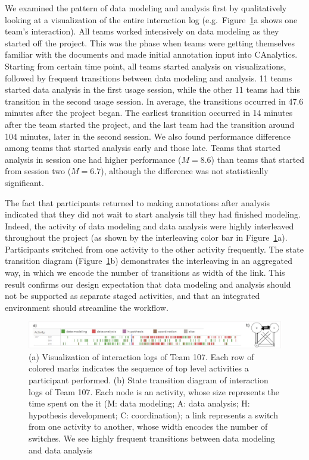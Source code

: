 We examined the pattern of data modeling and analysis first by
qualitatively looking at a visualization of the entire interaction log
(e.g.~Figure~\ref{fig:interleaving}a shows one team's interaction). All teams
worked intensively on data modeling as they started off the project.
This was the phase when teams were getting themselves familiar with the
documents and made initial annotation input into CAnalytics. Starting from certain
time point, all teams started analysis on visualizations,
followed by frequent transitions between data modeling and analysis. 11
teams started data analysis in the first usage session, while the other
11 teams had this transition in the second usage session. In average,
the transitions occurred in 47.6 minutes after the project began. The earliest transition occurred in 14 minutes after the team started the project, and the last team
had the transition around 104 minutes, later in the second session. We
also found performance difference among teams that started analysis
early and those late. Teams that started analysis in session one had
higher performance ($M=8.6$) than teams that started from session two
($M=6.7$), although the difference was not statistically significant.

The fact that participants returned to making annotations after analysis
indicated that they did not wait to start analysis till they had
finished modeling. Indeed, the activity of data modeling and data
analysis were highly interleaved throughout the project (as shown by the interleaving color bar in Figure~\ref{fig:interleaving}a). Participants switched from
one activity to the other activity frequently. The state transition
diagram (Figure~\ref{fig:interleaving}b) demonstrates the interleaving in an aggregated way, in which we
encode the number of transitions as width of the link. This result
confirms our design expectation that data modeling and analysis should
not be supported as separate staged activities, and that an integrated
environment should streamline the workflow.

\begin{figure}
\centering
\includegraphics[width=6.5in]{./img/intertwined.jpg}
\caption{(a) Visualization of interaction logs of Team 107. Each row of
colored marks indicates the sequence of top level activities a
participant performed. (b) State transition diagram of interaction logs of Team 107. Each node is an activity, whose size represents the time spent on the it (M: data modeling; A: data analysis; H: hypothesis development; C: coordination); a
link represents a switch from one activity to another, whose width
encodes the number of switches. We see highly frequent transitions between data modeling and data analysis \label{fig:interleaving}}
\end{figure}


